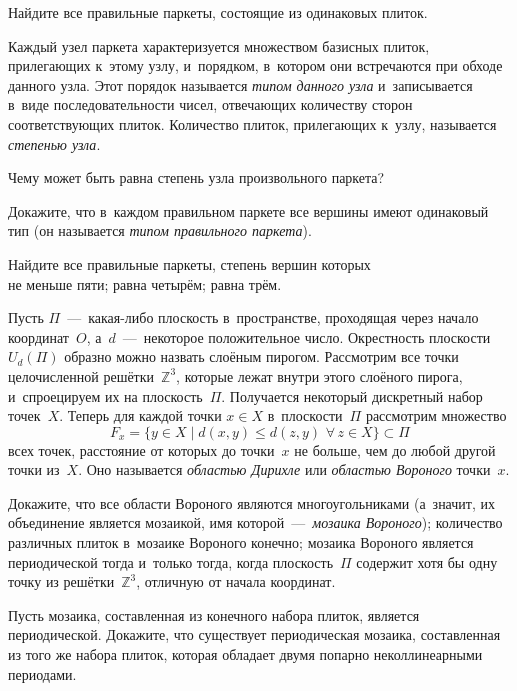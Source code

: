\documentclass[a4paper,12pt]{article}
\begin{document}
Найдите все правильные паркеты, состоящие из одинаковых плиток.

Каждый узел паркета характеризуется множеством базисных плиток, прилегающих к~этому узлу, и~порядком, в~котором они встречаются при обходе данного узла. Этот порядок называется \emph{типом данного узла} и~записывается в~виде последовательности чисел, отвечающих количеству сторон соответствующих плиток. Количество плиток, прилегающих к~узлу, называется \emph{степенью узла}.

Чему может быть равна степень узла произвольного паркета?

Докажите, что в~каждом правильном паркете все вершины имеют одинаковый тип (он называется \emph{типом правильного паркета}).

Найдите все правильные паркеты, степень вершин которых\\
 не меньше пяти;
 равна четырём;
 равна трём.

Пусть $\Pi$~---~какая-либо плоскость в~пространстве, проходящая через начало координат~$O$, а~$d$~---~некоторое положительное число. Окрестность плоскости $U_{d}(\Pi)$ образно можно назвать  слоёным пирогом. Рассмотрим все точки целочисленной решётки~$\mathbb Z^3$, которые лежат внутри этого  слоёного пирога, и~спроецируем их на плоскость~$\Pi$. Получается некоторый дискретный набор точек~$X$. Теперь для каждой точки $x\in X$ в~плоскости~$\Pi$ рассмотрим множество
\vspace{-3mm}
$$F_x=\{y\in X\mid d(x,y)\leqslant d(z,y)\,\,\forall\,z\in X\}\subset\Pi$$
всех точек, расстояние от которых до точки~$x$ не больше, чем до любой другой точки из~$X$. Оно называется \emph{областью Дирихле} или
\emph{областью Вороного} точки~$x$.

Докажите, что
 все области Вороного являются многоугольниками (а~значит, их объединение является мозаикой, имя которой~---~\emph{мозаика Вороного});
 количество различных плиток в~мозаике Вороного конечно;
 мозаика Вороного является периодической тогда и~только тогда, когда плоскость~$\Pi$ содержит хотя бы одну точку из решётки~$\mathbb Z^3$, отличную от начала координат.

 Пусть мозаика, составленная из конечного набора плиток, является периодической. Докажите, что существует периодическая мозаика, составленная из того же набора плиток, которая обладает двумя попарно неколлинеарными периодами.

\end{document}
